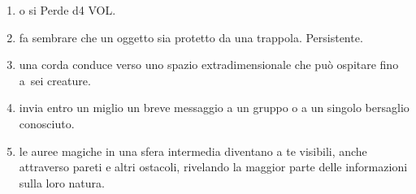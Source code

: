 \documentclass[itdr]{subfiles}
\begin{document}
\begin{enumerate}
	\item {}  o si Perde d4 VOL.
	\item {} fa sembrare che un oggetto sia protetto da una trappola. Persistente.
	\item {} una corda conduce verso uno spazio extradimensionale che può ospitare fino a~sei creature.
	\item {} invia entro un miglio un breve messaggio a un gruppo o a un singolo bersaglio conosciuto.
	\item {} le auree magiche in una sfera intermedia diventano a te visibili, anche attraverso pareti e altri ostacoli, rivelando la maggior parte delle informazioni sulla loro natura.
\end{enumerate}

\vfill
\break
\end{document}
